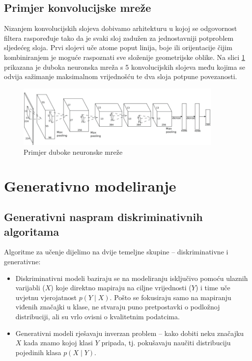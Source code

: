 \documentclass[lmodern, utf8, seminar]{fer}
\begin{document}
\section{Primjer konvolucijske mreže}
Nizanjem konvolucijskih slojeva dobivamo arhitekturu u kojoj se odgovornost filtera raspoređuje tako da je svaki sloj zadužen za jednostavniji potproblem sljedećeg sloja. Prvi slojevi uče atome poput linija, boje ili orijentacije čijim kombiniranjem je moguće raspoznati sve složenije geometrijske oblike. Na slici \ref{fig:dnn} prikazana je duboka neuronska mreža s 5 konvolucijskih slojeva među kojima se odvija sažimanje maksimalnom vrijednošću te dva sloja potpune povezanosti.
\newline

\begin{figure}[H]
    \centering
    \includegraphics[width=0.9\textwidth]{dnn}
    \caption{Primjer duboke neuronske mreže}
    \label{fig:dnn}
\end{figure}




\chapter{Generativno modeliranje}
\section{Generativni naspram diskriminativnih algoritama}
Algoritme za učenje dijelimo na dvije temeljne skupine -- diskriminativne i generativne:
\newline

\renewcommand{\labelitemi}{\textbullet}
\begin{itemize} 
\item Diskriminativni modeli baziraju se na modeliranju isključivo pomoću ulaznih varijabli ($X$) koje direktno mapiraju na ciljne vrijednosti ($Y$) i time uče uvjetnu vjerojatnost $p(Y\mid X)$. Pošto se fokusiraju samo na mapiranju viđenih značajki u klase, ne stvaraju puno pretpostavki o podložnoj distribuciji, ali su vrlo ovisni o kvalitetnim podatcima.

\item Generativni modeli rješavaju inverzan problem -- kako dobiti neku značajku $X$ kada znamo kojoj klasi $Y$ pripada, tj. pokušavaju naučiti distribuciju pojedinih klasa $p(X\mid Y)$.
\newline
\end{itemize}
\end{document}
